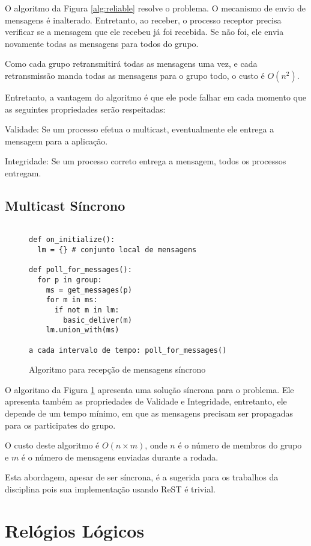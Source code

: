 \documentclass{book}
\begin{document}
O algoritmo da Figura \ref{alg:reliable} resolve o problema.
O mecanismo de envio de mensagens é inalterado.
Entretanto, ao receber, o processo receptor precisa verificar
se a mensagem que ele recebeu já foi recebida. Se não foi, ele envia
novamente todas as mensagens para todos do grupo.

Como cada grupo retransmitirá todas as mensagens uma vez, 
e cada retransmissão manda todas as mensagens para o grupo todo,
o custo é $O(n^2)$.

Entretanto, a vantagem do algoritmo é que ele pode falhar em cada momento que as seguintes
propriedades serão respeitadas:

Validade: Se um processo efetua o multicast, eventualmente ele entrega a mensagem
para a aplicação.

Integridade: Se um processo correto entrega a mensagem, todos os processos entregam.


\section{Multicast Síncrono}

\begin{figure}
\begin{verbatim}

def on_initialize():
  lm = {} # conjunto local de mensagens

def poll_for_messages():
  for p in group:
    ms = get_messages(p)
    for m in ms:
      if not m in lm:
        basic_deliver(m)
    lm.union_with(ms)

a cada intervalo de tempo: poll_for_messages()
\end{verbatim}
\caption{Algoritmo para recepção de mensagens síncrono}
\label{alg:sinc}
\end{figure}

O algoritmo da Figura \ref{alg:sinc} apresenta uma solução síncrona para o problema.
Ele apresenta também as propriedades de Validade e Integridade, entretanto, ele
depende de um tempo mínimo, em que as mensagens precisam ser propagadas para os participates do grupo.

O custo deste algoritmo é $O(n \times m)$, onde $n$ é o número de membros do grupo e $m$ é o número de 
mensagens enviadas durante a rodada.

Esta abordagem, apesar de ser síncrona, é a sugerida para os trabalhos da disciplina
pois sua implementação usando ReST é trivial.

\chapter{Relógios Lógicos}
\end{document}
